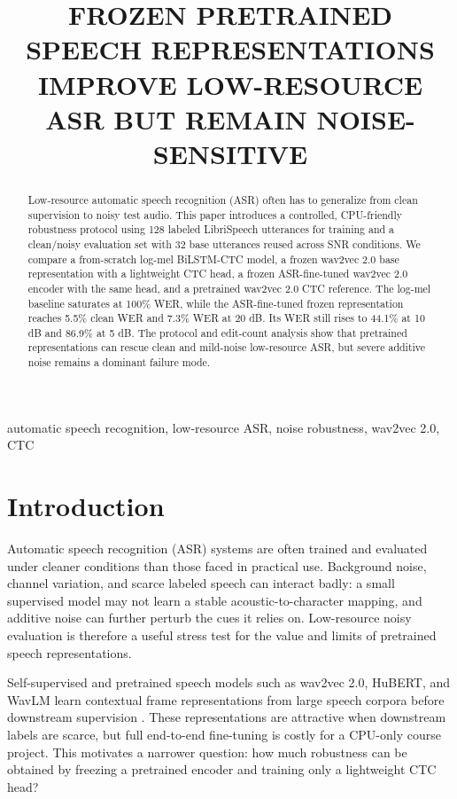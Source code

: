 \documentclass{article}
\title{FROZEN PRETRAINED SPEECH REPRESENTATIONS IMPROVE LOW-RESOURCE ASR BUT REMAIN NOISE-SENSITIVE}
\begin{document}
\ninept

\maketitle

\begin{abstract}
Low-resource automatic speech recognition (ASR) often has to generalize from clean supervision to noisy test audio. This paper introduces a controlled, CPU-friendly robustness protocol using 128 labeled LibriSpeech utterances for training and a clean/noisy evaluation set with 32 base utterances reused across SNR conditions. We compare a from-scratch log-mel BiLSTM-CTC model, a frozen wav2vec 2.0 base representation with a lightweight CTC head, a frozen ASR-fine-tuned wav2vec 2.0 encoder with the same head, and a pretrained wav2vec 2.0 CTC reference. The log-mel baseline saturates at 100\% WER, while the ASR-fine-tuned frozen representation reaches 5.5\% clean WER and 7.3\% WER at 20 dB. Its WER still rises to 44.1\% at 10 dB and 86.9\% at 5 dB. The protocol and edit-count analysis show that pretrained representations can rescue clean and mild-noise low-resource ASR, but severe additive noise remains a dominant failure mode.
\end{abstract}

\begin{keywords}
automatic speech recognition, low-resource ASR, noise robustness, wav2vec 2.0, CTC
\end{keywords}

\section{Introduction}
\label{sec:intro}

Automatic speech recognition (ASR) systems are often trained and evaluated under cleaner conditions than those faced in practical use. Background noise, channel variation, and scarce labeled speech can interact badly: a small supervised model may not learn a stable acoustic-to-character mapping, and additive noise can further perturb the cues it relies on. Low-resource noisy evaluation is therefore a useful stress test for the value and limits of pretrained speech representations.

Self-supervised and pretrained speech models such as wav2vec 2.0, HuBERT, and WavLM learn contextual frame representations from large speech corpora before downstream supervision \cite{baevski2020wav2vec2,hsu2021hubert,chen2022wavlm}. These representations are attractive when downstream labels are scarce, but full end-to-end fine-tuning is costly for a CPU-only course project. This motivates a narrower question: how much robustness can be obtained by freezing a pretrained encoder and training only a lightweight CTC head?
\end{document}
